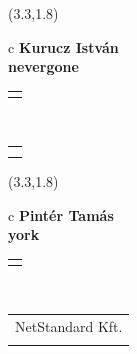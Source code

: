 \documentclass[11pt]{article}
\begin{document}
\makebox(3.3,1.8){
  \renewcommand\arraystretch{1.3}
  \begin{tabular}[c]{c}
    \hspace{8.5mm}
    \LARGE\bf{ Kurucz István }\\
    \hspace{8.5mm}
    \Large{ nevergone }\\
    \renewcommand\arraystretch{3}
    \begin{tabular}[c]{c}
      \centering
      \fontfamily{phv}\selectfont{
        \textbf{
          \textsc{
            \scriptsize{
            \color{Bright}{ Ismerkedő }\color{Dark}{ Webmester }\color{Dark}{ Sminkmester }\color{Dark}{ Programozó }
            }
          }
        }
      }
    \end{tabular}
    \\
    \renewcommand\arraystretch{1}
    \begin{tabular}{p{3.3in}}
      \hspace{.7cm}\\
      \hspace{.7cm}\emph{  }\\
    \end{tabular}
  \end{tabular}
}

\makebox(3.3,1.8){
  \renewcommand\arraystretch{1.3}
  \begin{tabular}[c]{c}
    \hspace{8.5mm}
    \LARGE\bf{ Pintér Tamás }\\
    \hspace{8.5mm}
    \Large{ york }\\
    \renewcommand\arraystretch{3}
    \begin{tabular}[c]{c}
      \centering
      \fontfamily{phv}\selectfont{
        \textbf{
          \textsc{
            \scriptsize{
            \color{Bright}{ Ismerkedő }\color{Dark}{ Webmester }\color{Bright}{ Sminkmester }\color{Dark}{ Programozó }
            }
          }
        }
      }
    \end{tabular}
    \\
    \renewcommand\arraystretch{1}
    \begin{tabular}{p{3.3in}}
      \hspace{.7cm}NetStandard Kft.\\
      \hspace{.7cm}\emph{  }\\
    \end{tabular}
  \end{tabular}
}
\end{document}
